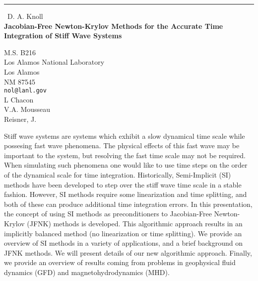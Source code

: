 \documentclass{report}
\begin{document}
\begin{center}
\rule{6in}{1pt} \
{\large D. A. Knoll \\
{\bf Jacobian-Free Newton-Krylov Methods for the Accurate Time Integration of Stiff Wave Systems}}

M.S. B216 \\ Los Alamos National Laboratory \\ Los Alamos \\ NM 87545
\\
{\tt nol@lanl.gov}\\
L Chacon\\
V.A. Mousseau\\
	Reisner, J.\end{center}

Stiff wave systems are systems which exhibit
a slow dynamical time scale while possesing fast wave phenomena.
The physical effects of this fast wave may be important to the
system, but resolving the fast time scale may not be required. When
simulating such phenomena one would like to use time steps on the
order of the dynamical scale for time integration. Historically,
Semi-Implicit (SI) methods have been developed to step
over the stiff wave time scale in a stable fashion. However,
SI methods require some linearization and time splitting, and
both of these can produce additional time integration errors.
In this presentation, the concept of using SI methods as preconditioners
to Jacobian-Free Newton-Krylov (JFNK) methods is developed.
This algorithmic approach results in an
implicitly balanced method (no linearization or time splitting).
We provide an overview of SI methods in
a variety of applications, and a brief background on JFNK methods.
We will present details of our new algorithmic approach. Finally,
we provide an overview of results coming from problems in
geophysical fluid dynamics (GFD) and magnetohydrodynamics (MHD).
\end{document}
